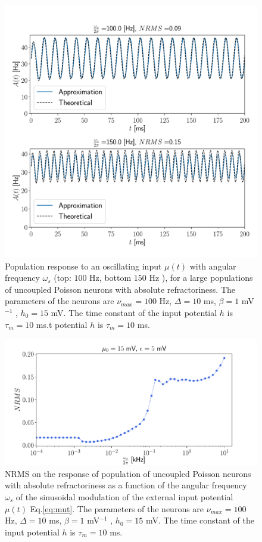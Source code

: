 \documentclass[12pt,twoside]{report}
\begin{document}
\begin{figure}[h!]
	\centering
	\includegraphics[width=0.8\linewidth]{A_omega_t.pdf}
	\caption{Population response to an oscillating input $\mu(t)$ with angular frequency $\omega_s$ (top: $100$ Hz, bottom $150$ Hz ), for a large populations of uncoupled Poisson neurons with absolute refractoriness. The parameters of the neurons are $\nu_{max}=100$ Hz, $\Delta=10$ ms, $\beta=1$ mV$^{-1}$ , $h_0=15$ mV. The time constant of the input potential $h$ is $\tau_m=10$ ms.t potential $h$ is $\tau_m=10$ ms.
	}
	\label{fig:A_omega_t}
\end{figure}


\begin{figure}[h!]
	\centering
	\includegraphics[width=0.8\linewidth]{NRMSo.pdf}
	\caption{NRMS on the response of population of uncoupled Poisson neurons with absolute refractoriness as a function of the  angular frequency $\omega_s$  of the sinusoidal modulation of the external input potential $\mu(t)$ Eq.\eqref{eq:mut}. The parameters of the neurons are $\nu_{max}=100$ Hz, $\Delta=10$ ms, $\beta=1$ mV$^{-1}$ , $h_0=15$ mV. The time constant of the input potential $h$ is $\tau_m=10$ ms.
	}
	\label{fig:NRMSo}
\end{figure}
\end{document}
